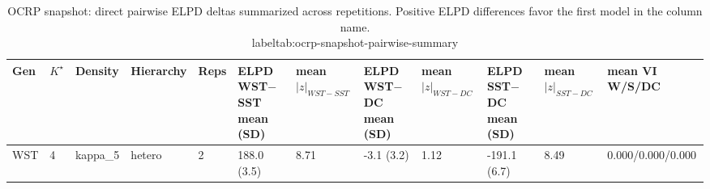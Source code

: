 \begin{table}[!h]
\centering
\caption{OCRP snapshot: direct pairwise ELPD deltas summarized across repetitions. Positive ELPD differences favor the first model in the column name.\\label{tab:ocrp-snapshot-pairwise-summary}}
\centering
\begin{tabular}[t]{llllllllllll}
\toprule
Gen & $K^\star$ & Density & Hierarchy & Reps & ELPD WST$-$SST mean (SD) & mean $|z|_{WST-SST}$ & ELPD WST$-$DC mean (SD) & mean $|z|_{WST-DC}$ & ELPD SST$-$DC mean (SD) & mean $|z|_{SST-DC}$ & mean VI W/S/DC\\
\midrule
WST & 4 & kappa_5 & hetero & 2 & 188.0 (3.5) & 8.71 & -3.1 (3.2) & 1.12 & -191.1 (6.7) & 8.49 & 0.000/0.000/0.000\\
\bottomrule
\end{tabular}
\end{table}
